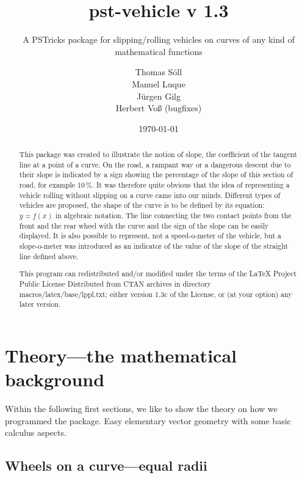 \documentclass[11pt,english,BCOR=10mm,DIV=12,bibliography=totoc,parskip=false,headings=small,
    headinclude=false,footinclude=false,oneside]{pst-doc}
\begin{document}
\title{pst-vehicle v 1.3}
\subtitle{A PSTricks package for slipping/rolling vehicles on curves of any kind of mathematical functions}
\author{Thomas Söll\\Manuel Luque\\Jürgen Gilg\\Herbert Voß (bugfixes)}
\date{\today}

\settitle

\tableofcontents
{}

\newpage


\begin{abstract}
This package was created to illustrate the notion of slope, the coefficient of the tangent line at a point of a curve. On the road, a rampant way or a dangerous descent due to their slope is indicated by a sign showing the percentage of the slope
of this section of road, for example 10\,\%. It was therefore quite obvious that the idea of representing a vehicle rolling without slipping on a curve came into our minds. Different types of vehicles are proposed, the shape of the curve is to be
defined by its equation: $y=f(x)$ in algebraic notation.
The line connecting the two contact points from the front and the rear wheel with the curve and the sign of the slope can be easily displayed. It is also possible to represent, not a speed-o-meter of the vehicle, but a slope-o-meter was
introduced as an indicator of the value of the slope of the straight line defined above.


\vfill
This program can redistributed and/or modified under %
the terms of the LaTeX Project Public License        %
Distributed from CTAN archives in directory          %
macros/latex/base/lppl.txt; either version 1.3c of   %
the License, or (at your option) any later version.  %

\end{abstract}


\newpage


\section{Theory---the mathematical background}

Within the following first sections, we like to show the theory on how we programmed 
the package. Easy elementary vector geometry with some basic calculus aspects.



\subsection{Wheels on a curve---equal radii}
\end{document}
